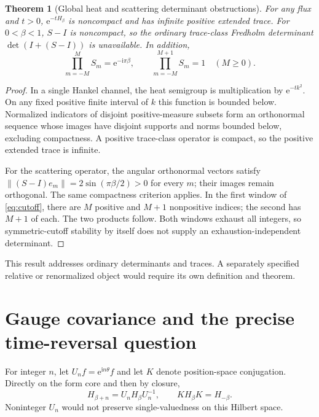 \documentclass[10pt]{article}
\newcommand{\e}{\mathrm e}
\newcommand{\ii}{\mathrm i}
\newtheorem{theorem}{Theorem}
\begin{document}
\begin{theorem}[Global heat and scattering determinant obstructions]
For any flux and $t>0$, $\e^{-tH_\beta}$ is noncompact and has infinite
positive extended trace. For $0<\beta<1$, $S-I$ is noncompact, so the ordinary
trace-class Fredholm determinant $\det(I+(S-I))$ is unavailable. In addition,
\begin{equation}
\prod_{m=-M}^{M}S_m=\e^{-\ii\pi\beta},\qquad
\prod_{m=-M}^{M+1}S_m=1\quad(M\ge0).
\label{eq:cutoff}
\end{equation}
\end{theorem}
\begin{proof}
In a single Hankel channel, the heat semigroup is multiplication by
$\e^{-tk^2}$. On any fixed positive finite interval of $k$ this function is
bounded below. Normalized indicators of disjoint positive-measure subsets
form an orthonormal sequence whose images have disjoint supports and norms
bounded below, excluding compactness. A positive trace-class operator is
compact, so the positive extended trace is infinite.

For the scattering operator, the angular orthonormal vectors satisfy
$\|(S-I)e_m\|=2\sin(\pi\beta/2)>0$ for every $m$; their images remain
orthogonal. The same compactness criterion applies. In the first window of
\eqref{eq:cutoff}, there are $M$ positive and $M+1$ nonpositive indices; the
second has $M+1$ of each. The two products follow. Both windows exhaust all
integers, so symmetric-cutoff stability by itself does not supply an
exhaustion-independent determinant.
\end{proof}
This result addresses ordinary determinants and traces. A separately specified
relative or renormalized object would require its own definition and theorem.

\section{Gauge covariance and the precise time-reversal question}
For integer $n$, let $U_nf=\e^{\ii n\theta}f$ and let $K$ denote
position-space conjugation. Directly on the form core and then by closure,
\begin{equation}
H_{\beta+n}=U_nH_\beta U_n^{-1},\qquad KH_\beta K=H_{-\beta}.
\label{eq:gauge}
\end{equation}
Noninteger $U_n$ would not preserve single-valuedness on this Hilbert space.
\end{document}
